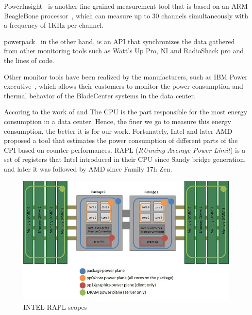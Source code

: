 PowerInsight~\cite{laros2013powerinsight} is another fine-grained measurement tool that is based on an ARM BeagleBone processor~\cite{coley2012beaglebone}, which can measure up to 30 channels simultaneously with a frequency of 1KHz per channel.

powerpack~\cite{ge2009powerpack} in the other hand, is an API that synchronizes the data gathered from other monitoring tools such as Watt’s Up Pro, NI and RadioShack pro and the lines of code. %

Other monitor tools have been realized by the manufacturers, such as IBM Power executive~\cite{koomey2011growth}, which allows their customers to monitor the power consumption and thermal behavior of the BladeCenter systems in the data center.


Accoring to the work of \citeauthor{vasques2019review} and\citeauthor{wang2018modelling}
The CPU is the part responsible for the most energy consumption in a data center\cite{vasques2019review,wang2018modelling}. Hence, the finer we go to measure this energy consumption, the better it is for our work.
Fortunately, Intel and later AMD proposed a tool that estimates the power consumption of different parts of the CPI based on counter performances.
RAPL (\emph{RUnning Average Power Limit}) \cite{hackenberg2013power,hackenberg2015energy} is a set of registers that Intel introduced in their CPU since Sandy bridge generation, and later it was followed by AMD since Family 17h Zen.


\begin{figure}[!hbt]
    \centering
    \includegraphics[width=0.8\linewidth]{imgs/power-planes-rapl}
    \caption{INTEL RAPL scopes
    }\label{fig:rapl-domaine}
\end{figure}

